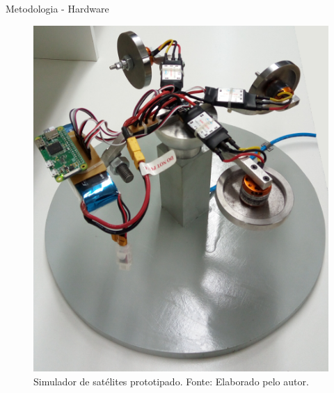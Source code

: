 \documentclass{beamer}
\begin{document}
\begin{frame}{Metodologia - Hardware}
    \begin{figure}[HT]
		\begin{center}
		\captionsetup{justification=centering}
        \includegraphics[scale=.3]{../metodologia/img/simulador_real}
        \caption{Simulador de satélites prototipado. \newline
        		 Fonte: Elaborado pelo autor.}
		\label{FIG_ADAPTATIVO}
        \end{center}
	\end{figure}
\end{frame}

\end{document}
